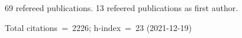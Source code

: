 69 refereed publications. 13 refeered publications as first author.

Total citations~=~2226; h-index~=~23 (2021-12-19)